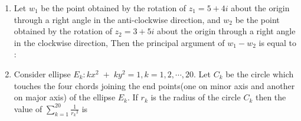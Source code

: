 \documentclass[journal,,12pt,onecolumn]{IEEEtran}
\theoremstyle{remark}
\begin{document}
\begin{enumerate}
\bigskip
\item Let $w_1$ be the point obtained by the rotation of $z_1=5+4i$ about the origin through a right angle in the anti-clockwise direction, and $w_2$ be the point obtained by the rotation of $z_2=3+5i$ about the origin through a right angle in the clockwise direction, Then the principal argument of $w_1-w_2$ is equal to :
\begin{enumerate}
\end{enumerate}
\bigskip
\item Consider ellipse $E_{k}:kx^2\;+\;ky^2=1,k=1,2,\cdots,20$. Let $C_k$ be the circle which touches the four chords joining the end points(one on minor axis and another on major axis) of the ellipse $E_k$. If $r_k$ is the radius of the circle $C_k$ then the value of $\sum_{k=1}^{20} \frac{1}{{r_k}^2}$ is 
\begin{enumerate}
\end{enumerate}
 \end{enumerate}
\end{document}
